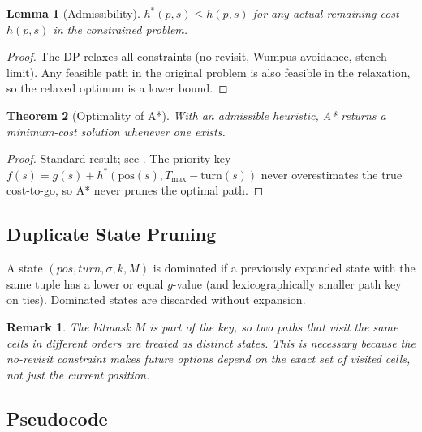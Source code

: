 \documentclass[12pt,a4paper]{article}
\newtheorem{theorem}{Theorem}
\newtheorem{lemma}[theorem]{Lemma}
\newtheorem{remark}{Remark}
\begin{document}
\begin{lemma}[Admissibility]
$h^*(p, s) \le h(p, s)$ for any actual remaining cost $h(p,s)$ in the
constrained problem.
\end{lemma}
\begin{proof}
The DP relaxes all constraints (no-revisit, Wumpus avoidance, stench limit).
Any feasible path in the original problem is also feasible in the relaxation,
so the relaxed optimum is a lower bound.
\end{proof}

\begin{theorem}[Optimality of A*]
With an admissible heuristic, A* returns a minimum-cost solution whenever one
exists.
\end{theorem}
\begin{proof}
Standard result; see \cite{hart1968}.  The priority key
$f(s) = g(s) + h^*(\text{pos}(s), T_{\max} - \text{turn}(s))$ never
overestimates the true cost-to-go, so A* never prunes the optimal path.
\end{proof}

\subsection{Duplicate State Pruning}

A state $(pos, turn, \sigma, k, M)$ is dominated if a previously expanded
state with the same tuple has a lower or equal $g$-value (and lexicographically
smaller path key on ties).  Dominated states are discarded without expansion.

\begin{remark}
The bitmask $M$ is part of the key, so two paths that visit the same cells in
different orders are treated as distinct states.  This is necessary because the
no-revisit constraint makes future options depend on the exact set of visited
cells, not just the current position.
\end{remark}

\subsection{Pseudocode}
\end{document}
